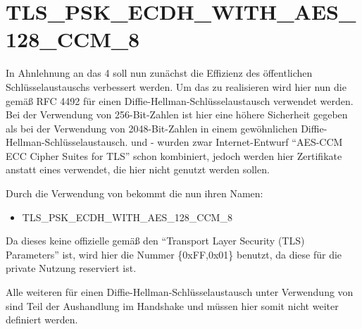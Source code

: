 \section{TLS\_PSK\_ECDH\_WITH\_AES\_128\_CCM\_8}

In Ahnlehnung an das  4 soll nun zunächst die Effizienz des öffentlichen Schlüsselaustauschs verbessert werden. Um das zu realisieren
wird hier nun die  gemäß RFC 4492 \cite{rfc4492} für einen Diffie-Hellman-Schlüsselaustausch verwendet werden. Bei der Verwendung von
256-Bit-Zahlen ist hier eine höhere Sicherheit gegeben als bei der Verwendung von 2048-Bit-Zahlen in einem gewöhnlichen Diffie-Hellman-Schlüsselaustausch.
 und - wurden zwar Internet-Entwurf "`AES-CCM ECC Cipher Suites for TLS"' \cite{draftaesecc} schon kombiniert, jedoch
werden hier Zertifikate anstatt eines  verwendet, die hier nicht genutzt werden sollen.

Durch die Verwendung von  bekommt die  nun ihren Namen:
\begin{itemize}
  \item TLS\_PSK\_ECDH\_WITH\_AES\_128\_CCM\_8
\end{itemize}
Da dieses keine offizielle  gemäß den "`Transport Layer Security (TLS) Parameters"' \cite{tlsparams} ist, wird hier die Nummer
\{0xFF,0x01\} benutzt, da diese für die private Nutzung reserviert ist.

Alle weiteren für einen Diffie-Hellman-Schlüsselaustausch unter Verwendung von  sind Teil der Aushandlung im Handshake und müssen
hier somit nicht weiter definiert werden.

